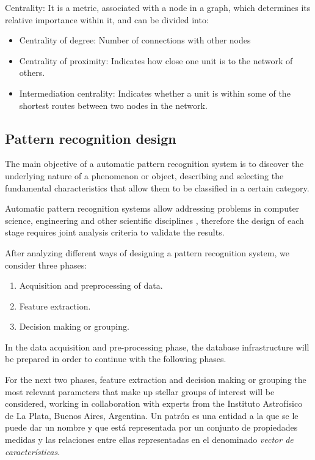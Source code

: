 	Centrality: It is a metric, associated with a node in a graph, which determines its relative importance within it, and can be divided into:
	
	\begin{itemize}
		\item Centrality of degree: Number of connections with other nodes
		\item Centrality of proximity: Indicates how close one unit is to the network of others.
		\item Intermediation centrality: Indicates whether a unit is within some of the shortest routes between two nodes in the network.
	\end{itemize}

	\subsection{Pattern recognition design}

	The main objective of a automatic pattern recognition system is to discover the underlying nature of a phenomenon or object, describing and selecting the fundamental characteristics that allow them to be classified in a certain category\cite{batagelj2006data,fukunaga2013introduction}.

	Automatic pattern recognition systems allow addressing problems in computer science, engineering and other scientific disciplines \cite{devijver2012pattern,meyer2004pattern}, therefore the design of each stage requires joint analysis criteria to validate the results\cite{kim2005robust,kim2005new}.

	After analyzing different ways of designing a pattern recognition system, we consider three phases\cite{alonso2001redes}:
	
	\begin{enumerate}
		\item Acquisition and preprocessing of data.
		\item Feature extraction.
		\item Decision making or grouping.
	\end{enumerate}
	
	In the data acquisition and pre-processing phase, the database infrastructure will be prepared in order to continue with the following phases.
	
	For the next two phases, feature extraction and decision making or grouping the most relevant parameters that make up stellar groups of interest will be considered, working in collaboration with experts from the Instituto Astrofísico de La Plata, Buenos Aires, Argentina.
\else
	Un patrón es una entidad a la que se le puede dar un nombre y que está representada por un conjunto de propiedades medidas y las relaciones entre ellas representadas en el denominado \emph{vector de características}\cite{watanabe1985pattern}. 
	

